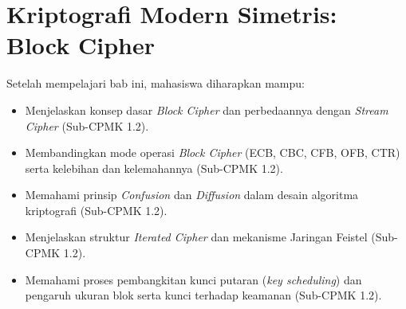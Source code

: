 \documentclass[../../main.tex]{subfiles}
\begin{document}
\chapter{Kriptografi Modern Simetris: Block Cipher}
\label{chap:block-cipher}

\begin{learningoutcome}
Setelah mempelajari bab ini, mahasiswa diharapkan mampu:
\begin{itemize}
    \item Menjelaskan konsep dasar \textit{Block Cipher} dan perbedaannya dengan \textit{Stream Cipher} (Sub-CPMK 1.2).
    \item Membandingkan mode operasi \textit{Block Cipher} (ECB, CBC, CFB, OFB, CTR) serta kelebihan dan kelemahannya (Sub-CPMK 1.2).
    \item Memahami prinsip \textit{Confusion} dan \textit{Diffusion} dalam desain algoritma kriptografi (Sub-CPMK 1.2).
    \item Menjelaskan struktur \textit{Iterated Cipher} dan mekanisme Jaringan Feistel (Sub-CPMK 1.2).
    \item Memahami proses pembangkitan kunci putaran (\textit{key scheduling}) dan pengaruh ukuran blok serta kunci terhadap keamanan (Sub-CPMK 1.2).
\end{itemize}
\end{learningoutcome}










\end{document}
